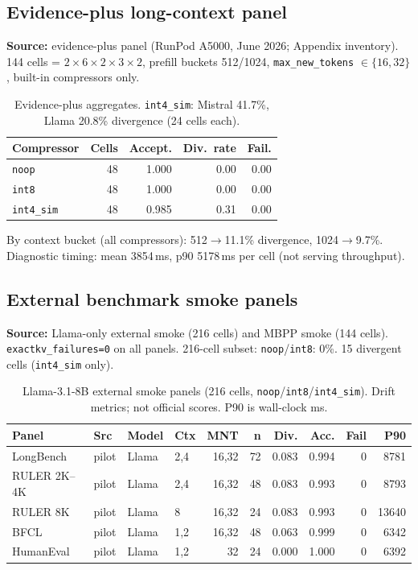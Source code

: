 \documentclass[11pt]{article}
\begin{document}
\subsection{Evidence-plus long-context panel}
\textbf{Source:} evidence-plus panel (RunPod A5000, June 2026; Appendix inventory).
144 cells = $2 \times 6 \times 2 \times 3 \times 2$, prefill buckets 512/1024,
\texttt{max\_new\_tokens} $\in \{16,32\}$, built-in compressors only.
\begin{table}[htbp]
\centering\small
\begin{tabular}{lrrrr}
\toprule
Compressor & Cells & Accept. & Div.\ rate & Fail. \\ \midrule
\texttt{noop} & 48 & 1.000 & 0.00 & 0.00 \\
\texttt{int8} & 48 & 1.000 & 0.00 & 0.00 \\
\texttt{int4\_sim} & 48 & 0.985 & 0.31 & 0.00 \\
\bottomrule
\end{tabular}
\caption{Evidence-plus aggregates. \texttt{int4\_sim}: Mistral 41.7\%, Llama 20.8\% divergence (24 cells each).}
\end{table}
By context bucket (all compressors): 512$\to$11.1\% divergence, 1024$\to$9.7\%.
Diagnostic timing: mean 3854\,ms, p90 5178\,ms per cell (not serving throughput).

\subsection{External benchmark smoke panels}
{\sloppy\noindent\textbf{Source:} Llama-only external smoke (216 cells) and MBPP smoke
(144 cells). \texttt{exactkv\_failures=0} on all panels. 216-cell subset:
\texttt{noop}/\texttt{int8}: 0\%. 15 divergent cells (\texttt{int4\_sim} only).\par}

\begin{table}[htbp]
\centering\scriptsize
\setlength{\tabcolsep}{3.5pt}
\renewcommand{\arraystretch}{1.05}
\begin{tabular}{@{}llllrrrrrr@{}}
\toprule
\textbf{Panel} & \textbf{Src} & \textbf{Model} & \textbf{Ctx} & \textbf{MNT} & \textbf{n} & \textbf{Div.} & \textbf{Acc.} & \textbf{Fail} & \textbf{P90} \\ \midrule
LongBench & pilot & Llama & 2,4 & 16,32 & 72 & 0.083 & 0.994 & 0 & 8781 \\
RULER 2K--4K & pilot & Llama & 2,4 & 16,32 & 48 & 0.083 & 0.993 & 0 & 8793 \\
RULER 8K & pilot & Llama & 8 & 16,32 & 24 & 0.083 & 0.993 & 0 & 13640 \\
BFCL & pilot & Llama & 1,2 & 16,32 & 48 & 0.063 & 0.999 & 0 & 6342 \\
HumanEval & pilot & Llama & 1,2 & 32 & 24 & 0.000 & 1.000 & 0 & 6392 \\
\bottomrule
\end{tabular}
\caption{Llama-3.1-8B external smoke panels (216 cells, \texttt{noop}/\texttt{int8}/\texttt{int4\_sim}).
Drift metrics; not official scores. P90 is wall-clock ms.}
\label{tab:external-smoke}
\end{table}
\end{document}
